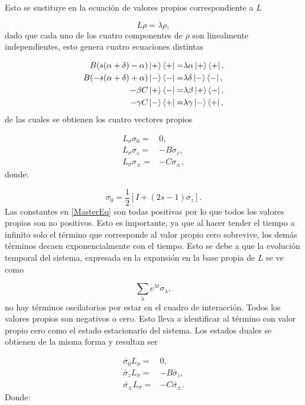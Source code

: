 \documentclass[a4paper,10pt]{report}
\begin{document}
Esto se sustituye en la ecuación de valores propios correspondiente a $L$

\begin{equation}
L\rho = \lambda\rho,
\end{equation} dado que cada uno de los cuatro componentes de $\rho$ son linealmente independientes, esto genera cuatro ecuaciones distintas

\begin{align}
B(s(\alpha+\delta)-\alpha)\Ket{+}\Bra{+} =& \lambda\alpha\Ket{+}\Bra{+},\\
B(-s(\alpha+\delta)+\alpha)\Ket{-}\Bra{-} =& \lambda\delta\Ket{-}\Bra{-},\\
-\beta C \Ket{+}\Bra{-} =& \lambda \beta \Ket{+}\Bra{-}, \\
-\gamma C \Ket{-}\Bra{+} =& \lambda \gamma \Ket{-}\Bra{+},
\end{align}de las cuales se obtienen los cuatro vectores propios

\begin{align}
L_\sigma \sigma_0 =& 0, \\
L_\sigma \sigma_z =& -B \sigma_z, \\
L_\sigma \sigma_\pm =& -C \sigma_\pm,
\end{align} donde:

\begin{equation}
\sigma_0 = \frac{1}{2}[I + (2s-1)\sigma_z].
\end{equation} Las constantes en \eqref{MasterEq} son todas positivas por lo que todos los valores propios son no positivos. Esto es importante, ya que al hacer tender el tiempo a infinito solo el término que corresponde al valor propio cero sobrevive, los demás términos decaen exponencialmente con el tiempo. Esto se debe a que la evolución temporal del sistema, expresada en la expansión en la base propia de $L$ se ve como

\begin{equation}
\sum_\lambda e^{\lambda t} \sigma_\lambda,
\end{equation} no hay términos oscilatorios por estar en el cuadro de interacción. Todos los valores propios son negativos o cero. Esto lleva a identificar al término con valor propio cero como el estado estacionario del sistema. Los estados duales se obtienen de la misma forma y resultan ser\cite{EnglertDB}

\begin{align}
\check{\sigma_0} L_\sigma  =& 0, \\
\check{\sigma_z} L_\sigma =& -B \check{\sigma_z}, \\
\check{\sigma_{\pm}} L_\sigma =& -C \check{\sigma_{\pm}}.
\end{align} Donde:
\end{document}
